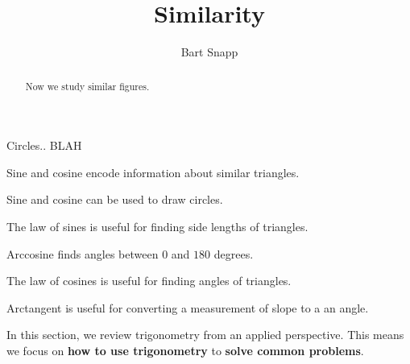 \documentclass[handout,nooutcomes,noauthor]{ximera}
\title{Similarity}
\author{Bart Snapp}
\begin{document}
\begin{abstract}
  Now we study similar figures.
\end{abstract}
\maketitle


\begin{listSectionOutcomes}
\item Circles.. BLAH 
\item Sine and cosine encode information about similar triangles.
\item Sine and cosine can be used to draw circles.
\item The law of sines is useful for finding side lengths of
  triangles.
\item Arccosine finds angles between $0$ and $180$ degrees.
\item The law of cosines is useful for finding angles of triangles.
\item Arctangent is useful for converting a measurement of slope to a
  an angle.
\end{listSectionOutcomes}


In this section, we review trigonometry from an applied
perspective. This means we focus on \textbf{how to use trigonometry}
to \textbf{solve common problems}.
\end{document}
